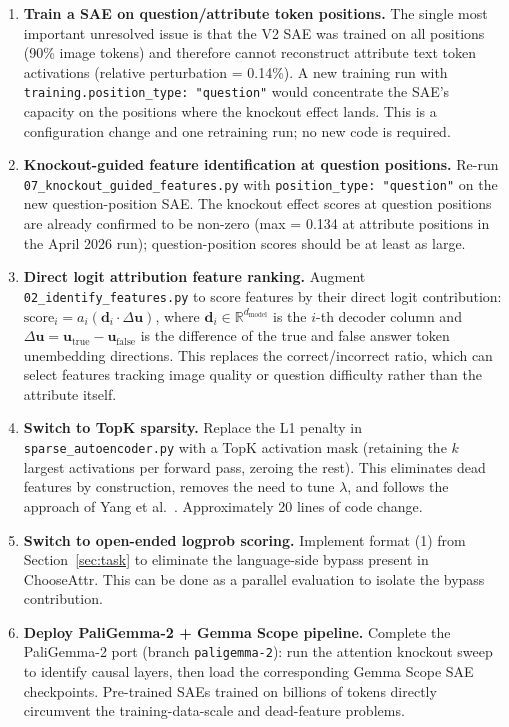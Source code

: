 \documentclass[11pt,a4paper]{article}
\begin{document}
\begin{enumerate}[label=\textbf{N\arabic*.}]

  \item \textbf{Train a SAE on question/attribute token positions.}
    The single most important unresolved issue is that the V2 SAE was trained on all positions
    (90\% image tokens) and therefore cannot reconstruct attribute text token activations
    (relative perturbation = 0.14\%).
    A new training run with \texttt{training.position\_type: "question"} would concentrate the
    SAE's capacity on the positions where the knockout effect lands.
    This is a configuration change and one retraining run; no new code is required.

  \item \textbf{Knockout-guided feature identification at question positions.}
    Re-run \texttt{07\_knockout\_guided\_features.py} with \texttt{position\_type: "question"}
    on the new question-position SAE.
    The knockout effect scores at question positions are already confirmed to be non-zero
    (max = 0.134 at attribute positions in the April 2026 run); question-position scores
    should be at least as large.

  \item \textbf{Direct logit attribution feature ranking.}
    Augment \texttt{02\_identify\_features.py} to score features by their direct logit
    contribution: $\text{score}_i = a_i (\mathbf{d}_i \cdot \Delta\mathbf{u})$, where
    $\mathbf{d}_i \in \mathbb{R}^{d_{\mathrm{model}}}$ is the $i$-th decoder column and
    $\Delta\mathbf{u} = \mathbf{u}_{\text{true}} - \mathbf{u}_{\text{false}}$ is the
    difference of the true and false answer token unembedding directions.
    This replaces the correct/incorrect ratio, which can select features tracking
    image quality or question difficulty rather than the attribute itself.

  \item \textbf{Switch to TopK sparsity.}
    Replace the L1 penalty in \texttt{sparse\_autoencoder.py} with a TopK activation mask
    (retaining the $k$ largest activations per forward pass, zeroing the rest).
    This eliminates dead features by construction, removes the need to tune $\lambda$, and
    follows the approach of Yang et al.~\citep{yang2026circuitvlm}.
    Approximately 20 lines of code change.

  \item \textbf{Switch to open-ended logprob scoring.}
    Implement format (1) from Section~\ref{sec:task} to eliminate the language-side bypass
    present in ChooseAttr.
    This can be done as a parallel evaluation to isolate the bypass contribution.

  \item \textbf{Deploy PaliGemma-2 + Gemma Scope pipeline.}
    Complete the PaliGemma-2 port (branch \texttt{paligemma-2}): run the attention knockout
    sweep to identify causal layers, then load the corresponding Gemma Scope SAE checkpoints.
    Pre-trained SAEs trained on billions of tokens directly circumvent the training-data-scale
    and dead-feature problems.

\end{enumerate}
\end{document}
